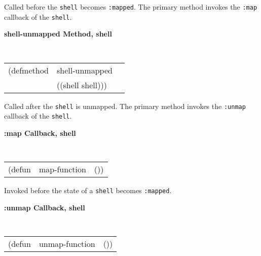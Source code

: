 \documentclass[twoside]{book}
\begin{document}
\begin{sloppy}
{\begin{flushright}
{}\end{flushright}}

\begin{flushright} \parbox[t]{6.125in}{
Called before the {\tt shell} becomes {\tt :mapped}. The primary method invokes
the {\tt :map} callback of the {\tt shell}.

}\end{flushright}

{\samepage
{\large {\bf shell-unmapped \hfill Method, shell}}
\begin{flushright} \parbox[t]{6.125in}{
\tt
\begin{tabular}{lll}
\raggedright
(defmethod & shell-unmapped & \\
           & ((shell  shell)))
\end{tabular}
\rm

}\end{flushright}}

\begin{flushright} \parbox[t]{6.125in}{
Called after the {\tt shell} is unmapped. The primary method invokes
the {\tt :unmap} callback of the {\tt shell}.

}\end{flushright}


{\samepage
{\large {\bf :map \hfill Callback, shell}} 
\begin{flushright} 
\parbox[t]{6.125in}{
\tt
\begin{tabular}{lll}
\raggedright
(defun & map-function & ())
\end{tabular}
\rm

}\end{flushright}}

\begin{flushright} \parbox[t]{6.125in}{
Invoked before the state of a {\tt shell} becomes {\tt :mapped}.

}\end{flushright}


{\samepage
{\large {\bf :unmap \hfill Callback, shell}} 
\begin{flushright} 
\parbox[t]{6.125in}{
\tt
\begin{tabular}{lll}
\raggedright
(defun & unmap-function & ())
\end{tabular}
\rm

}\end{flushright}}


\end{sloppy}
\end{document}
